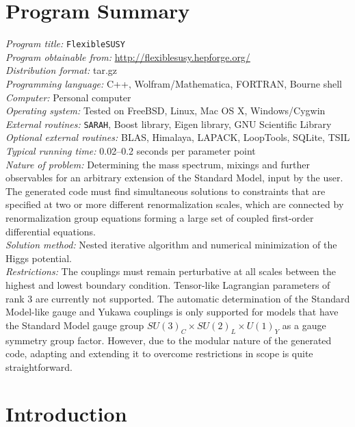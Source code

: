 \documentclass[final,3p,11pt,pdflatex]{elsarticle}
\makeatletter
\newcommand{\sarah}{\texttt{SARAH}\@\xspace}
\newcommand{\fs}{\texttt{FlexibleSUSY}\@\xspace}
\makeatother
\begin{document}
\clearpage
{}
\section*{Program Summary}
\noindent
{\em Program title:} \fs\\[0.5em]
{\em Program obtainable from:} \url{http://flexiblesusy.hepforge.org/}\\[0.5em]
{\em Distribution format:} tar.gz\\[0.5em]
{\em Programming language:} C++, Wolfram/Mathematica, FORTRAN, Bourne shell\\[0.5em]
{\em Computer:} Personal computer\\[0.5em]
{\em Operating system:} Tested on FreeBSD, Linux, Mac OS X, Windows/Cygwin\\[0.5em]
{\em External routines:} \sarah, Boost library, Eigen library, GNU Scientific Library\\[0.5em]
{\em Optional external routines:} BLAS, Himalaya, LAPACK, LoopTools, SQLite, TSIL\\[0.5em]
{\em Typical running time:} 0.02--0.2 seconds per parameter point\\[0.5em]
{\em Nature of problem:}
%
Determining the mass spectrum, mixings and further observables for an arbitrary extension
of the Standard Model, input by the user. The generated code must find
simultaneous solutions to constraints that are specified at two or
more different renormalization scales, which are connected by
renormalization group equations forming a large set of coupled
first-order differential
equations. \\[0.5em]
%
{\em Solution method:}
%
Nested iterative algorithm and numerical
minimization of the Higgs potential.\\[0.5em]
%
{\em Restrictions:}
%
The couplings must remain perturbative at all scales between the
highest and lowest boundary condition.  Tensor-like Lagrangian
parameters of rank 3 are currently not supported.  The automatic
determination of the Standard Model-like gauge and Yukawa couplings is
only supported for models that have the Standard Model gauge group
$SU(3)_C\times SU(2)_L\times U(1)_Y$ as a gauge symmetry group factor.
However, due to the modular nature of the generated code, adapting and
extending it to overcome restrictions in scope is quite straightforward.

\clearpage
\tableofcontents

\newpage
\section{Introduction}
\end{document}
